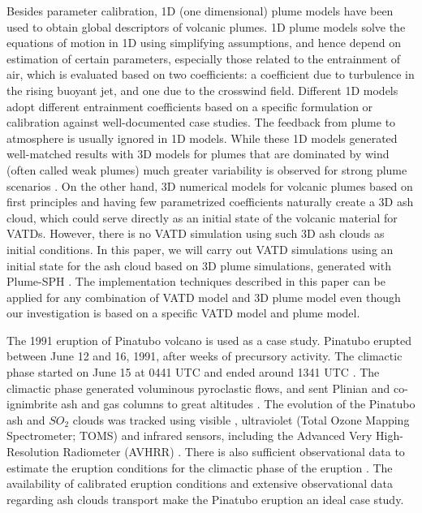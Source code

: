 \documentclass[utf8]{frontiersSCNS} %
\begin{document}
Besides parameter calibration, 1D (one dimensional) plume models have been used to obtain global descriptors of volcanic plumes. 1D plume models \citep [e.g.][]{woods1988fluid, bursik2001effect, mastin2007user, de2015plume, folch2016fplume, pouget2016sensitivity} solve the equations of motion in 1D using simplifying assumptions, and hence depend on estimation of certain parameters, especially those related to the entrainment of air, which is evaluated based on two coefficients: a coefficient due to turbulence in the rising buoyant jet, and one due to the crosswind field. Different 1D models adopt different entrainment coefficients based on a specific formulation or calibration against well-documented case studies. The feedback from plume to atmosphere is usually ignored in 1D models. While these 1D models generated well-matched results with 3D models for plumes that are dominated by wind (often called weak plumes) much greater variability is observed for strong plume scenarios \citep{costa2016results}. On the other hand, 3D numerical models for volcanic plumes based on first principles and having few parametrized coefficients \citep{oberhuber1998volcanic, neri2003multiparticle, suzuki2005numerical, cerminara2016ashee, cao2018plume} naturally create a 3D ash cloud, which could serve directly as an initial state of the volcanic material for VATDs. However, there is no VATD simulation using such 3D ash clouds as initial conditions. In this paper, we will carry out VATD simulations using an initial state for the ash cloud based on 3D plume simulations, generated with Plume-SPH \citep{cao2018plume, cao2017data}. The implementation techniques described in this paper can be applied for any combination of VATD model and 3D plume model even though our investigation is based on a specific VATD model and plume model.


The 1991 eruption of Pinatubo volcano is used as a case study. Pinatubo erupted between June 12 and 16, 1991, after weeks of precursory activity. The climactic phase started on June 15 at 0441 UTC and ended around 1341 UTC \citep{holasek1996satellite}. The climactic phase generated voluminous pyroclastic flows, and sent Plinian and co-ignimbrite ash and gas columns to great altitudes \citep{scott1996pyroclastic}. The evolution of the Pinatubo ash and $SO_2$ clouds was tracked using visible \citep{holasek1996satellite}, ultraviolet (Total Ozone Mapping Spectrometer; TOMS) \citep{guo2004re} and infrared sensors, including the Advanced Very High-Resolution Radiometer (AVHRR) \citep{guo2004particles}. There is also sufficient observational data to estimate the eruption conditions for the climactic phase of the eruption \citep{suzuki2009three}. The availability of calibrated eruption conditions and extensive observational data regarding ash clouds transport make the Pinatubo eruption an ideal case study.
\end{document}
